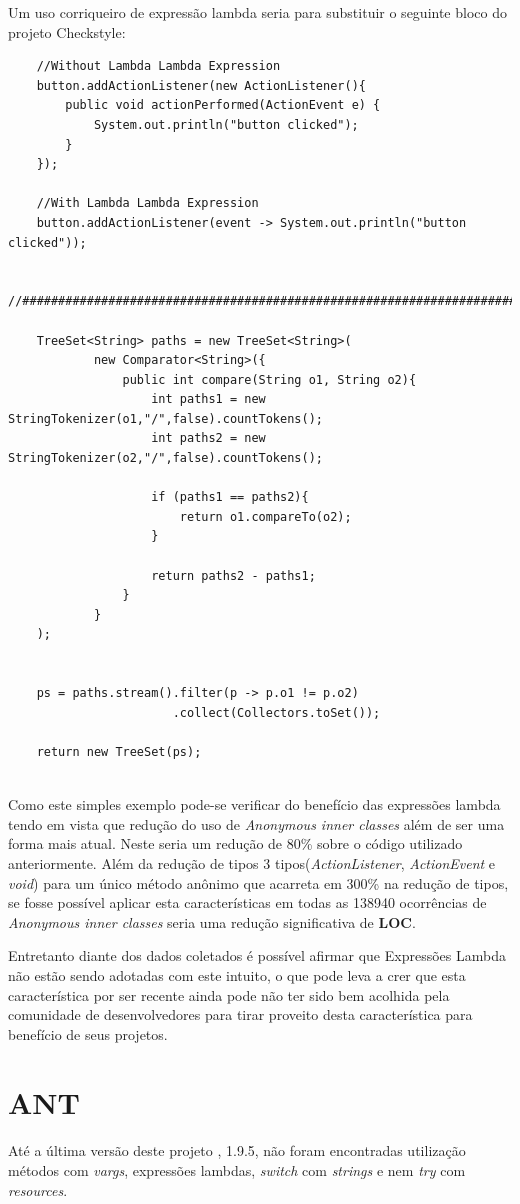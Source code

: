 Um uso corriqueiro de expressão lambda seria para substituir o seguinte bloco do projeto Checkstyle:
\begin{lstlisting}
	//Without Lambda Lambda Expression
	button.addActionListener(new ActionListener(){
		public void actionPerformed(ActionEvent e) {
			System.out.println("button clicked");
		}
	});

	//With Lambda Lambda Expression
	button.addActionListener(event -> System.out.println("button clicked"));
	
	//###########################################################################
	
	TreeSet<String> paths = new TreeSet<String>(
			new Comparator<String>({
				public int compare(String o1, String o2){
					int paths1 = new StringTokenizer(o1,"/",false).countTokens();
					int paths2 = new StringTokenizer(o2,"/",false).countTokens();
				
					if (paths1 == paths2){
						return o1.compareTo(o2);
					}
				
					return paths2 - paths1;
				}
			}
	);
	
	
	ps = paths.stream().filter(p -> p.o1 != p.o2)
					   .collect(Collectors.toSet());
	
	return new TreeSet(ps);
	
\end{lstlisting}

Como este simples exemplo pode-se verificar do benefício das expressões lambda tendo em vista que  redução do uso de \textit{Anonymous inner classes} além de ser uma forma mais atual. Neste seria um redução de 80\% sobre o código utilizado anteriormente. Além da redução de tipos 3 tipos(\textit{ActionListener}, \textit{ActionEvent} e \textit{void}) para um único método anônimo que acarreta em 300\% na redução de tipos,  se fosse possível aplicar esta características em todas as 138940 ocorrências de \textit{Anonymous inner classes} seria uma redução significativa de \textbf{LOC}.

Entretanto diante dos dados coletados é possível afirmar que Expressões Lambda não estão sendo adotadas com este intuito, o que pode leva a crer que esta característica por ser recente ainda pode não ter sido bem acolhida pela comunidade de desenvolvedores para tirar proveito desta  característica para benefício de seus projetos.\\




\section{ANT}
Até a última versão deste projeto \cite{apacheAnt}, 1.9.5, não foram encontradas utilização métodos com \textit{vargs}, expressões lambdas, \textit{switch} com \textit{strings} e nem \textit{try} com \textit{resources}.\\

